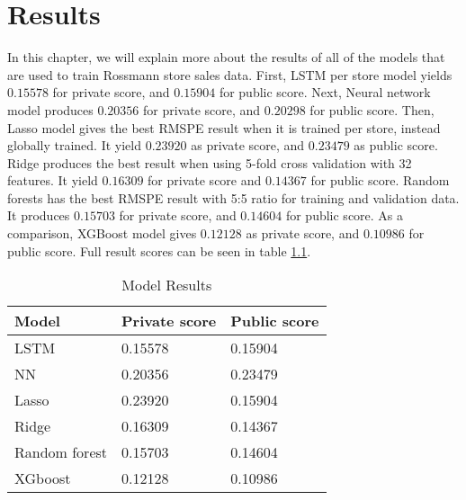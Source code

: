 \chapter{Results}
In this chapter, we will explain more about the results of all of the models that are used to train Rossmann store sales data. 
First, LSTM per store model yields $0.15578$ for private score, and $0.15904$ for public score. Next, Neural network model produces $0.20356$ for private score, and $0.20298$ for public score. Then, Lasso model gives the best RMSPE result when it is trained per store, instead globally trained. It yield $0.23920$ as private score, and $0.23479$ as public score. Ridge produces the best result when using 5-fold cross validation with 32 features. It yield $0.16309$ for private score and $0.14367$ for public score. Random forests has the best RMSPE result with 5:5 ratio for training and validation data. It produces $0.15703$ for private score, and $0.14604$ for public score. As a comparison, XGBoost model gives $0.12128$ as private score, and $0.10986$ for public score. Full result scores can be seen in table \ref{tab:result}.
\begin{table}[H]
	\centering
	\caption{Model Results}
	\label{tab:result}
	\begin{tabular}{|m{200pt}|m{100pt}|m{100pt}|}
		\hline
		Model & Private score & Public score \\ \hline
		LSTM & 0.15578 & 0.15904 \\ \hline
		NN & 0.20356 & 0.23479 \\ \hline
		Lasso & 0.23920 & 0.15904 \\ \hline
		Ridge & 0.16309 & 0.14367 \\ \hline
		Random forest & 0.15703 & 0.14604 \\ \hline
		XGboost & 0.12128 & 0.10986 \\ \hline
	\end{tabular}
\end{table}